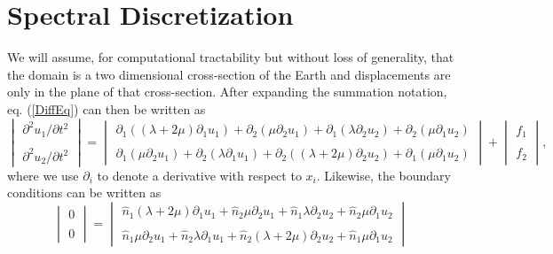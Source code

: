 \documentclass[12pt]{article}
\begin{document}
\section*{Spectral Discretization}
We will assume, for computational tractability but without loss of
generality, that the domain is a two dimensional cross-section of the
Earth and displacements are only in the plane of that cross-section.
After expanding the summation notation, eq. (\ref{DiffEq}) can then be
written as
\begin{equation}
\begin{vmatrix}
  \partial^2 u_1/\partial t^2\\ \\
  \partial^2 u_2/\partial t^2
\end{vmatrix} =
\begin{vmatrix}
 \partial_1\left((\lambda + 2\mu)\partial_1 u_1\right) +  
 \partial_2\left(\mu\partial_2 u_1\right) + 
 \partial_1\left(\lambda\partial_2 u_2\right) +  
 \partial_2\left(\mu\partial_1 u_2\right)\\ \\
 \partial_1\left(\mu\partial_2 u_1\right) +  
 \partial_2\left(\lambda\partial_1 u_1\right) + 
 \partial_2\left((\lambda + 2\mu)\partial_2 u_2\right) +  
 \partial_1\left(\mu\partial_1 u_2\right) 
\end{vmatrix} + 
\begin{vmatrix}
  f_1\\ \\
  f_2
\end{vmatrix},
\end{equation}
where we use $\partial_i$ to denote a derivative with respect to
$x_i$.  Likewise, the boundary conditions can be written as
\begin{equation}
\begin{vmatrix}
  0\\ \\
  0
\end{vmatrix} =
\begin{vmatrix}
 \hat{n}_1(\lambda + 2\mu)\partial_1 u_1 +  
 \hat{n}_2\mu\partial_2 u_1 + 
 \hat{n}_1\lambda\partial_2 u_2 +  
 \hat{n}_2\mu\partial_1 u_2\\ \\
 \hat{n}_1\mu\partial_2 u_1 +  
 \hat{n}_2\lambda\partial_1 u_1 + 
 \hat{n}_2(\lambda + 2\mu)\partial_2 u_2 +  
 \hat{n}_1\mu\partial_1 u_2
\end{vmatrix} 
\end{equation}
\end{document}
